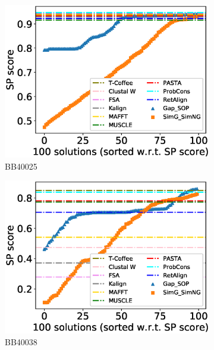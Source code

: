 \begin{figure}[!htbp]
\begin{adjustwidth}{-1.5cm}{-1cm}
\begin{subfigure}{0.22\textwidth}
			\includegraphics[width=\columnwidth]{Figure/summary/precomputedInit/Balibase/BB40025_pairs_density_single_run_2}
			\caption{BB40025}
		\end{subfigure}
		\begin{subfigure}{0.22\textwidth}
			\includegraphics[width=\columnwidth]{Figure/summary/precomputedInit/Balibase/BB40038_pairs_density_single_run_2}
			\caption{BB40038}
		\end{subfigure}
		\begin{subfigure}{0.22\textwidth}

\end{subfigure}
\end{adjustwidth}
\end{figure}
